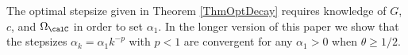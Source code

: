 \documentclass[smallextended]{svjour3}
\begin{document}
The optimal stepsize given in Theorem \ref{ThmOptDecay} requires knowledge of $G$, $c$, and $\Omega_{\calC}$ in order to set $\alpha_1$. In the longer version of this paper \cite{johnstone2017faster} we show that the stepsizes $\alpha_k=\alpha_1 k^{-p}$ with $p<1$ are convergent for any $\alpha_1>0$ when $\theta\geq 1/2$. 
 



 


















\end{document}
